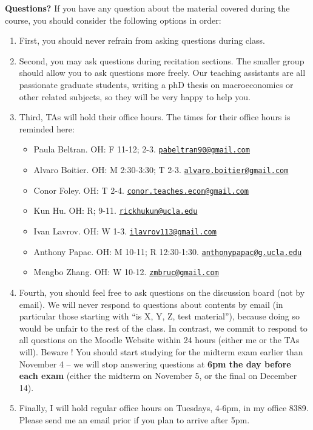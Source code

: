 \documentclass[]{book}
\providecommand{\tightlist}{%
  \setlength{\itemsep}{0pt}\setlength{\parskip}{0pt}}
\begin{document}
\textbf{Questions?} If you have any question about the material covered
during the course, you should consider the following options in order:

\begin{enumerate}
\def\labelenumi{\arabic{enumi}.}
\item
  First, you should never refrain from asking questions during class.
\item
  Second, you may ask questions during recitation sections. The smaller
  group should allow you to ask questions more freely. Our teaching
  assistants are all passionate graduate students, writing a phD thesis
  on macroeconomics or other related subjects, so they will be very
  happy to help you.
\item
  Third, TAs will hold their office hours. The times for their office
  hours is reminded here:

  \begin{itemize}
  \tightlist
  \item
    Paula Beltran. OH: F 11-12; 2-3.
    \href{mailto:pabeltran90@gmail.com}{\nolinkurl{pabeltran90@gmail.com}}
  \item
    Alvaro Boitier. OH: M 2:30-3:30; T 2-3.
    \href{mailto:alvaro.boitier@gmail.com}{\nolinkurl{alvaro.boitier@gmail.com}}
  \item
    Conor Foley. OH: T 2-4.
    \href{mailto:conor.teaches.econ@gmail.com}{\nolinkurl{conor.teaches.econ@gmail.com}}
  \item
    Kun Hu. OH: R; 9-11.
    \href{mailto:rickhukun@ucla.edu}{\nolinkurl{rickhukun@ucla.edu}}
  \item
    Ivan Lavrov. OH: W 1-3.
    \href{mailto:ilavrov113@gmail.com}{\nolinkurl{ilavrov113@gmail.com}}
  \item
    Anthony Papac. OH: M 10-11; R 12:30-1:30.
    \href{mailto:anthonypapac@g.ucla.edu}{\nolinkurl{anthonypapac@g.ucla.edu}}
  \item
    Mengbo Zhang. OH: W 10-12.
    \href{mailto:zmbruc@gmail.com}{\nolinkurl{zmbruc@gmail.com}}
  \end{itemize}
\item
  Fourth, you should feel free to ask questions on the discussion board
  (not by email). We will never respond to questions about contents by
  email (in particular those starting with ``is X, Y, Z, test
  material''), because doing so would be unfair to the rest of the
  class. In contrast, we commit to respond to all questions on the
  Moodle Website within 24 hours (either me or the TAs will). Beware !
  You should start studying for the midterm exam earlier than November 4
  -- we will stop answering questions at \textbf{6pm the day before each
  exam} (either the midterm on November 5, or the final on December 14).
\item
  Finally, I will hold regular office hours on Tuesdays, 4-6pm, in my
  office 8389. Please send me an email prior if you plan to arrive after
  5pm.
\end{enumerate}
\end{document}
